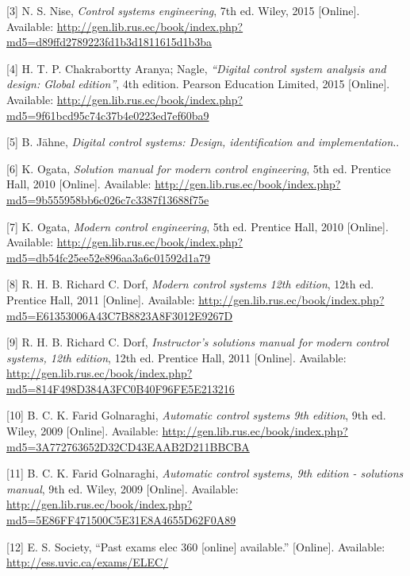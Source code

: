 \documentclass{scrreprt}
\theoremstyle{plain}
\theoremstyle{definition}
\theoremstyle{remark}
\begin{document}
\hypertarget{ref-textbook:nise}{}
{[}3{]} N. S. Nise, \emph{Control systems engineering}, 7th ed. Wiley,
2015 {[}Online{]}. Available:
\url{http://gen.lib.rus.ec/book/index.php?md5=d89ffd2789223fd1b3d1811615d1b3ba}

\hypertarget{ref-book:DCSphil}{}
{[}4{]} H. T. P. Chakrabortty Aranya; Nagle, \emph{``Digital control
	system analysis and design: Global edition''}, 4th edition. Pearson
Education Limited, 2015 {[}Online{]}. Available:
\url{http://gen.lib.rus.ec/book/index.php?md5=9f61bcd95c74c37b4e0223ed7ef60ba9}

\hypertarget{ref-book:209199}{}
{[}5{]} B. Jähne, \emph{Digital control systems: Design, identification
	and implementation}..

\hypertarget{ref-textbook:ogataSolution}{}
{[}6{]} K. Ogata, \emph{Solution manual for modern control engineering},
5th ed. Prentice Hall, 2010 {[}Online{]}. Available:
\url{http://gen.lib.rus.ec/book/index.php?md5=9b555958bb6c026c7c3387f13688f75e}

\hypertarget{ref-textbook:ogata}{}
{[}7{]} K. Ogata, \emph{Modern control engineering}, 5th ed. Prentice
Hall, 2010 {[}Online{]}. Available:
\url{http://gen.lib.rus.ec/book/index.php?md5=db54fc25ee52e896aa3a6c01592d1a79}

\hypertarget{ref-textbook:dorf}{}
{[}8{]} R. H. B. Richard C. Dorf, \emph{Modern control systems 12th
	edition}, 12th ed. Prentice Hall, 2011 {[}Online{]}. Available:
\url{http://gen.lib.rus.ec/book/index.php?md5=E61353006A43C7B8823A8F3012E9267D}

\hypertarget{ref-textbook:dorfSolution}{}
{[}9{]} R. H. B. Richard C. Dorf, \emph{Instructor's solutions manual
	for modern control systems, 12th edition}, 12th ed. Prentice Hall, 2011
{[}Online{]}. Available:
\url{http://gen.lib.rus.ec/book/index.php?md5=814F498D384A3FC0B40F96FE5E213216}

\hypertarget{ref-textbook:kuo}{}
{[}10{]} B. C. K. Farid Golnaraghi, \emph{Automatic control systems 9th
	edition}, 9th ed. Wiley, 2009 {[}Online{]}. Available:
\url{http://gen.lib.rus.ec/book/index.php?md5=3A772763652D32CD43EAAB2D211BBCBA}

\hypertarget{ref-textbook:kuoSolutions}{}
{[}11{]} B. C. K. Farid Golnaraghi, \emph{Automatic control systems, 9th
	edition - solutions manual}, 9th ed. Wiley, 2009 {[}Online{]}.
Available:
\url{http://gen.lib.rus.ec/book/index.php?md5=5E86FF471500C5E31E8A4655D62F0A89}

\hypertarget{ref-essElec360:Online}{}
{[}12{]} E. S. Society, ``Past exams elec 360 {[}online{]} available.''
{[}Online{]}. Available: \url{http://ess.uvic.ca/exams/ELEC/}
\end{document}
